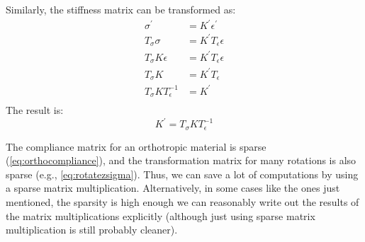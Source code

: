 \documentclass{article}
\begin{document}
Similarly, the stiffness matrix can be transformed as:
\begin{equation}
\begin{aligned}
\sigma^\prime & = K^\prime \epsilon^\prime \\
T_\sigma \sigma & = K^\prime T_\epsilon \epsilon \\
T_\sigma K \epsilon & = K^\prime T_\epsilon \epsilon \\
T_\sigma K  & = K^\prime T_\epsilon  \\
T_\sigma K T_\epsilon^{-1}  & = K^\prime  \\
\end{aligned}
\end{equation}
The result is:
\begin{equation}
K^\prime = T_\sigma K T_\epsilon^{-1}
\label{eq:Krotate}
\end{equation}

The compliance matrix for an orthotropic material is sparse (\cref{eq:orthocompliance}), and the transformation matrix for many rotations is also sparse (e.g., \cref{eq:rotatezsigma}).  Thus, we can save a lot of computations by using a sparse matrix multiplication.  Alternatively, in some cases like the ones just mentioned, the sparsity is high enough we can reasonably write out the results of the matrix multiplications explicitly (although just using sparse matrix multiplication is still probably cleaner).
\end{document}
